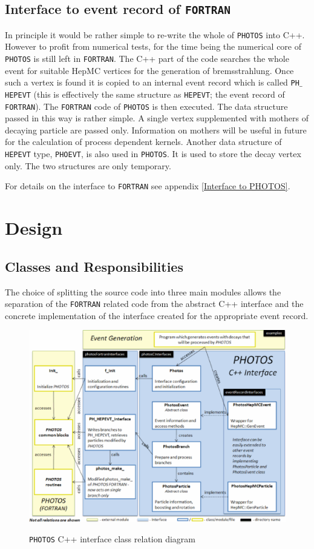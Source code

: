 \documentclass[]{Photos_interface_design}
\begin{document}
\subsection{Interface to event record of {\tt FORTRAN}}
\label{sect:F77fill}

In principle it would be rather simple to re-write the whole of {\tt PHOTOS} into
C++. However to profit from numerical tests, for the time being the numerical core of {\tt PHOTOS}
is still left in {\tt FORTRAN}. The C++ part of the code searches the whole event for
suitable HepMC vertices for the generation of bremsstrahlung. Once such
a vertex is found it is copied to an internal event record  which is 
called  {\tt PH$\_$HEPEVT} (this is effectively the same structure as {\tt HEPEVT};
the event record of {\tt FORTRAN}).
The {\tt FORTRAN} code of {\tt PHOTOS} is then executed.
The data structure passed in this way is rather simple. A single vertex
supplemented with mothers of decaying particle are passed only. Information 
on mothers will be useful in future for the calculation of process dependent 
kernels. Another data structure of   {\tt HEPEVT} type, {\tt PHOEVT}, is also 
used in {\tt PHOTOS}. It is used to store the decay vertex only.  
The two structures are only temporary.


For details on the interface to {\tt FORTRAN} see appendix \ref{Interface to PHOTOS}.


\section{Design}
\label{sec:design}
\subsection{Classes and Responsibilities}

The choice of splitting the source code into three main modules
 allows the separation of the {\tt FORTRAN} related code from the abstract C++ interface
and the concrete implementation of the interface created for the appropriate
event record.

\begin{figure}[h!]
\centering
\includegraphics[scale=0.6]{interface_design.eps}
\label{fig:design}
\caption{{\tt PHOTOS} C++ interface class relation diagram}
\end{figure}
\end{document}
